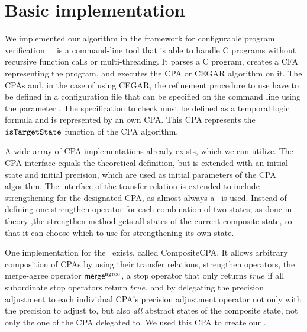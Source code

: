 \section{Basic implementation}
We implemented our algorithm in the framework for configurable program verification \cpaChecker \cite{Beyer2011}.
\CpaChecker\ is a command-line tool that is able to handle C programs without recursive function calls or multi-threading.
It parses a C program, creates a CFA representing the program, and executes the CPA or CEGAR algorithm on it.
The CPAs and, in the case of using CEGAR, the refinement procedure to use have to be defined in a configuration file that can be specified on the command line using the parameter
.
The specification to check must be defined as a temporal logic formula and is represented by an own CPA.
This CPA represents the $\texttt{isTargetState}$ function of the CPA algorithm.

A wide array of CPA implementations already exists, which we can utilize.
The CPA interface equals the theoretical definition, but is extended with an initial state and initial precision, which are used as initial parameters of the CPA algorithm.
The interface of the transfer relation is extended to include strengthening for the designated CPA, as almost always a \compositeCPA\ is used.
Instead of defining one strengthen operator for each combination of two states, as done in theory ,the strengthen method gets all states of the current composite state, so that it can choose which to use for strengthening its own state.

One implementation for the \compositeCPA\ exists, called CompositeCPA.
It allows arbitrary composition of CPAs by using their transfer relations, strengthen operators, 
the merge-agree operator $\operatorname{{\operatorname{\operatorname{\mathsf{merge}}}^{agree}}}$, a stop operator that only returns $true$ if all subordinate stop operators return $true$,  and by delegating the precision adjustment to each individual CPA's precision adjustment operator not only with the precision to adjust to,
but also \emph{all} abstract states of the composite state, not only the one of the CPA delegated to.
We used this CPA to create our \symbolicExecutionCPA.

